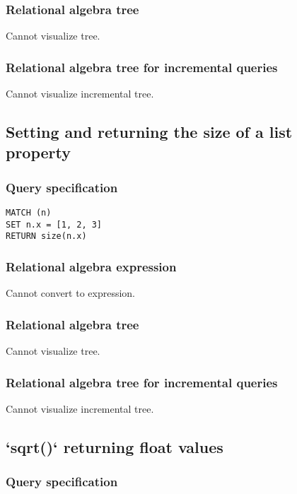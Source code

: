 \subsubsection*{Relational algebra tree}

Cannot visualize tree.

\subsubsection*{Relational algebra tree for incremental queries}

Cannot visualize incremental tree.

\subsection{Setting and returning the size of a list property}

\subsubsection*{Query specification}

\begin{lstlisting}
MATCH (n)
SET n.x = [1, 2, 3]
RETURN size(n.x)
\end{lstlisting}

\subsubsection*{Relational algebra expression}

Cannot convert to expression.

\subsubsection*{Relational algebra tree}

Cannot visualize tree.

\subsubsection*{Relational algebra tree for incremental queries}

Cannot visualize incremental tree.

\subsection{`sqrt()` returning float values}

\subsubsection*{Query specification}


